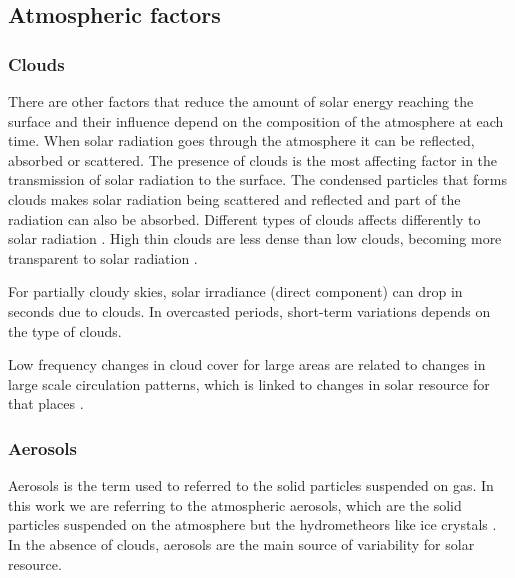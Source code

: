 \subsection{Atmospheric factors}

\subsubsection{Clouds}

There are other factors that reduce the amount of solar energy reaching the surface and their influence depend on the composition of the atmosphere at each time. When solar radiation goes through the atmosphere it can be reflected, absorbed or scattered. The presence of clouds is the most affecting factor in the transmission of solar radiation to the surface. The condensed particles that forms clouds makes solar radiation being scattered and reflected and part of the radiation can also be absorbed. Different types of clouds affects differently to solar radiation \cite*{Page2012}. High thin clouds are less dense than low clouds, becoming more transparent to solar radiation \cite*{Kasten1980}. %

For partially cloudy skies, solar irradiance (direct component) can drop in seconds \cite*{Page2012} due to clouds. In overcasted periods, short-term variations depends on the type of clouds.

Low frequency changes in cloud cover for large areas are related to changes in large scale circulation patterns, which is linked to changes in solar resource for that places \cite*{Chiacchio2010, Sanchez-Lorenzo2009}.

\subsubsection{Aerosols}

Aerosols is the term used to referred to the solid particles suspended on gas. In this work we are referring to the atmospheric aerosols, which are the solid particles suspended on the atmosphere but the hydrometheors like ice crystals \cite*{boucher2015}. In the absence of clouds, aerosols are the main source of variability for solar resource. 

